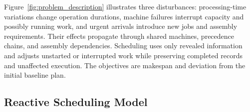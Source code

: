 Figure~\ref{fig:problem_description} illustrates three disturbances: processing-time variations change operation durations,
machine failures interrupt capacity and possibly running work, and urgent arrivals introduce new jobs and assembly requirements. Their effects propagate through shared machines, precedence chains,
and assembly dependencies. Scheduling uses only revealed information and adjusts unstarted or interrupted work while preserving completed records and unaffected execution. The objectives are makespan
and deviation from the initial baseline plan.




\subsection{Reactive Scheduling Model}
\label{subsec:mathematical_model}

